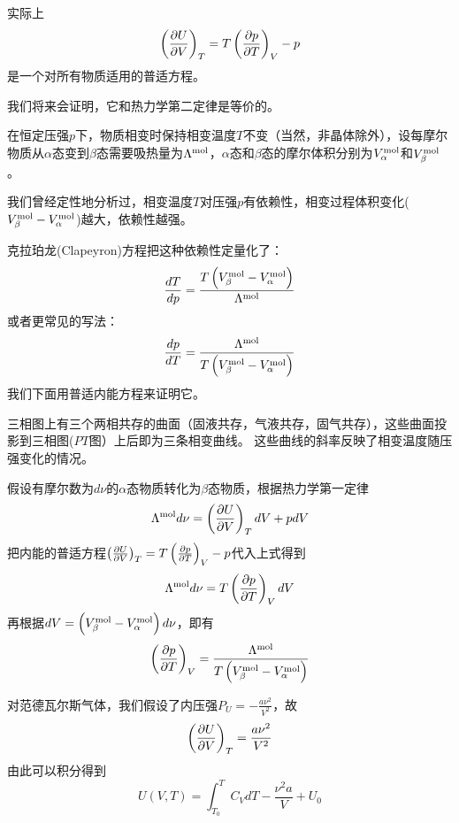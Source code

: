 \documentclass[CJK]{beamer}
\begin{document}
\begin{frame}
\bch
{\small
实际上
{\blue 
$$\left(\frac{\partial U}{\partial V}\right)_{T} = T \left(\frac{\partial p}{\partial T}\right)_{V} - p $$
}
是一个对所有物质适用的普适方程。

\skipline

我们将来会证明，它和热力学第二定律是等价的。
}
\ech
\end{frame}


\begin{frame}
\bch
{\small

在恒定压强$p$下，物质相变时保持相变温度$T$不变（当然，非晶体除外），设每摩尔物质从$\alpha$态变到$\beta$态需要吸热量为$\Lambda^{\rm mol}$，$\alpha$态和$\beta$态的摩尔体积分别为$V_\alpha^{\rm mol}$和$V_\beta^{\rm mol}$。

\skipline

我们曾经定性地分析过，相变温度$T$对压强$p$有依赖性，相变过程体积变化($V_\beta^{\rm mol}-V_\alpha^{\rm mol}$)越大，依赖性越强。

\skipline

克拉珀龙(Clapeyron)方程把这种依赖性定量化了：
$$\frac{dT}{dp} = \frac{T\left(V_\beta^{\rm mol}-V_\alpha^{\rm mol}\right)}{\Lambda^{\rm mol}}$$
或者更常见的写法：
$$ \frac{dp}{dT} = \frac{\Lambda^{\rm mol}}{T\left(V_\beta^{\rm mol} - V_\alpha^{\rm mol}\right)}$$
我们下面用普适内能方程来证明它。}
\ech
\end{frame}


\begin{frame}
\bch
{}\hspace{0.1in}

三相图上有三个两相共存的曲面（固液共存，气液共存，固气共存），这些曲面投影到三相图($PT$图）上后即为三条相变曲线。
这些曲线的斜率反映了相变温度随压强变化的情况。
\ech
\end{frame}


\begin{frame}
\bch
假设有摩尔数为$d\nu$的$\alpha$态物质转化为$\beta$态物质，根据热力学第一定律
$$ \Lambda^{\rm mol} d\nu = \left(\frac{\partial U}{\partial V}\right)_{T} dV+ p dV $$
把内能的普适方程$\left(\frac{\partial U}{\partial V}\right)_{T} = T\left(\frac{\partial p}{\partial T}\right)_{V} - p$代入上式得到
$$ \Lambda^{\rm mol} d\nu = T\left(\frac{\partial p}{\partial T}\right)_{V} dV $$
再根据$dV = \left(V_\beta^{\rm mol} - V_\alpha^{\rm mol}\right)d\nu$，即有
$$ \left(\frac{\partial p}{\partial T}\right)_{V} = \frac{\Lambda^{\rm mol}}{T\left(V_\beta^{\rm mol} - V_\alpha^{\rm mol}\right)}$$
\ech
\end{frame}


\begin{frame}
\bch
{\small
对范德瓦尔斯气体，我们假设了内压强$P_U = -\frac{a\nu^2}{V^2}$，故
$$\left(\frac{\partial U}{\partial V}\right)_{T} = \frac{a\nu^2}{V^2}$$
由此可以积分得到
$$U(V, T) = \int_{T_0}^T C_V dT -\frac{\nu^2a}{V} + U_0$$
}
\ech
\end{frame}
\end{document}

